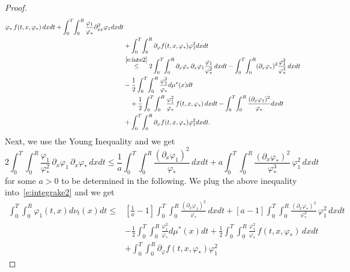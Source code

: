 \documentclass[11pt,leqno]{amsart}
\numberwithin{equation}{section}
\begin{document}
\begin{proof}
\begin{equation}
\begin{split}
{    }{{\varphi}_\ast} \, f(t, x, {\varphi}_\ast) \, dx dt + \int_0^T \!
    \int_0^R \frac{{\varphi}_1 }{{\varphi}_\ast} {\partial_{xx}^2}{\varphi}_1 dx dt  
    \\
    & + \int_0^T \!  \int_0^R {\partial}_{\varphi} f(t,x,{\varphi}_\ast){\varphi}_1^2
    dx dt
    \\
    & \stackrel{\eqref{e:inte2}}{\leq} 2 \int_0^T \!  \int_0^R {\partial_x }
    {\varphi}_\ast \, {\partial_x } {\varphi}_1 \frac{{\varphi}_1}{{\varphi}^2_\ast} \, dx dt -
    \int_0^T \! \int_0^R ( {\partial_x } {\varphi}_\ast)^2
    \frac{{\varphi}_1^2}{{\varphi}^3_\ast} \, dx dt
    \\
    & - \frac{1}{2} \int_0^T
    \!  \int_0^R \frac{{\varphi}_1^2 }{{\varphi}_\ast} d \mu^\ast (x) dt 
    \\
    &
    \quad + \frac{1}{2} \int_0^T \!  \int_0^R \frac{{\varphi}_1^2
    }{{\varphi}_\ast} \, f(t, x, {\varphi}_\ast) \, dx dt - \int_0^T \!
    \int_0^R \frac{( {\partial_x } {\varphi}_1)^2 }{{\varphi}_\ast}dx dt 
    \\
    & + \int_0^T \!  \int_0^R {\partial}_{\varphi} f(t,x,{\varphi}_\ast){\varphi}_1^2 dx dt .
  \end{split}
\end{equation}
Next, we use the Young Inequality and we get 
$$ 
2 \int_0^T \!
\int_0^R    \frac{{\varphi}_1}{{\varphi}^2_\ast} \, {\partial_x } {\varphi}_1 \, {\partial_x } {\varphi}_\ast \, dx dt 
\leq \frac{1}{a} \int_0^T \!
\int_0^R   \frac{( {\partial_x } {\varphi}_1)^2 }{{\varphi}_\ast} \, dx dt +
a \int_0^T \!
\int_0^R   \frac{( {\partial_x } {\varphi}_\ast)^2 }{{\varphi}^3_\ast} \, {\varphi}_1^2 \, dx dt 
$$
for some $a>0$ to be determined in the following. 
We plug the above inequality into~\eqref{e:integrake2} and we get 
\begin{equation}
  \label{e:integrake3}
  \begin{split}
    \int_0^T \! \! \int_0^R {\varphi}_1(t,x) d\nu_t(x)dt \leq & \left[
      \frac{1}{a} -1 \right] \int_0^T \! \! \int_0^R \frac{( {\partial_x }
      {\varphi}_1)^2}{{\varphi}_\ast} \, dx dt + [a-1] \int_0^T \!  \int_0^R
    \frac{( {\partial_x } {\varphi}_\ast)^2 }{{\varphi}^3_\ast} \, {\varphi}_1^2 \, dx dt
    \\
    &-
    \frac{1}{2} \int_0^T \!  \int_0^R \frac{{\varphi}_1^2 }{{\varphi}_\ast} d
    \mu^\ast (x) dt + \frac{1}{2} \int_0^T \!  \int_0^R \frac{{\varphi}_1^2
    }{{\varphi}_\ast}
    \, f(t, x, {\varphi}_\ast)  \, dx dt  
    \\
    & + \int_0^T \!  \int_0^R {\partial}_{\varphi} f(t, x,{\varphi}_\ast){\varphi}_1^2

\end{split}
\end{equation}
\end{proof}
\end{document}
